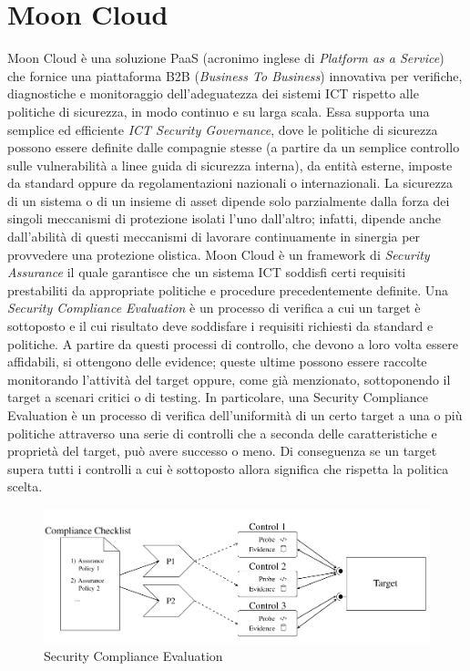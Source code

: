 \section{Moon Cloud}
Moon Cloud è una soluzione PaaS (acronimo inglese di \textit{Platform as a Service}) che fornice una piattaforma B2B 
(\textit{Business To Business}) innovativa per verifiche, diagnostiche e monitoraggio dell'adeguatezza dei sistemi ICT rispetto alle politiche di 
sicurezza, in modo continuo e su larga scala. Essa supporta una semplice ed efficiente \textit{ICT Security Governance}, dove le politiche 
di sicurezza possono essere definite dalle compagnie stesse (a partire da un semplice controllo sulle vulnerabilità a linee guida di
sicurezza interna), da entità esterne, imposte da standard oppure da regolamentazioni nazionali o internazionali.
La sicurezza di un sistema o di un insieme di asset dipende solo parzialmente dalla forza dei singoli meccanismi di protezione isolati
l'uno dall'altro; infatti, dipende anche dall'abilità di questi meccanismi di lavorare continuamente in sinergia per provvedere una 
protezione olistica.\hfill\break
Moon Cloud è un framework di \textit{Security Assurance} il quale garantisce che un sistema ICT soddisfi certi requisiti 
prestabiliti da appropriate politiche e procedure precedentemente definite.
Una \textit{Security Compliance Evaluation} è un processo di verifica a cui un target è sottoposto e il cui risultato 
deve soddisfare i requisiti richiesti da standard e politiche. A partire da questi processi di controllo, che devono a loro volta essere 
affidabili, si ottengono delle evidence; queste ultime possono essere raccolte monitorando l'attività del target oppure, come già 
menzionato, sottoponendo il target a scenari critici o di testing.\hfill\break
In particolare, una Security Compliance Evaluation è un processo di verifica dell'uniformità di un certo target a una o più politiche 
attraverso una serie di controlli che a seconda delle caratteristiche e proprietà del target, può avere successo o meno. Di 
conseguenza se un target supera tutti i controlli a cui è sottoposto allora significa che rispetta la politica scelta.
\begin{figure}[ht!]
    \includegraphics[scale=0.5]{images/Security_Compliance_Evaluation.png}
    \caption{Security Compliance Evaluation}
    \label{fig:Security_Compliance_Evaluation}
\end{figure}
